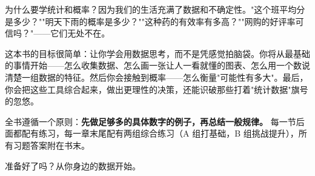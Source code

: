 \documentclass[a4paper,12pt]{ctexart}
\begin{document}
\newpage

\pagestyle{plain}


为什么要学统计和概率？因为我们的生活充满了数据和不确定性。"这个班平均分是多少？""明天下雨的概率是多少？""这种药的有效率有多高？""网购的好评率可信吗？"——它们无处不在。

这本书的目标很简单：让你学会用数据思考，而不是凭感觉拍脑袋。你将从最基础的事情开始——怎么收集数据、怎么画一张让人一看就懂的图表、怎么用一个数说清楚一组数据的特征。然后你会接触到概率——怎么衡量"可能性有多大"。最后，你会把这些工具综合起来，做出更理性的决策，还能识破那些打着"统计数据"旗号的忽悠。

全书遵循一个原则：\textbf{先做足够多的具体数字的例子，再总结一般规律。} 每一节后面都配有练习，每一章末尾配有两组综合练习（A 组打基础，B 组挑战提升），所有习题答案附在书末。

准备好了吗？从你身边的数据开始。

\newpage

\tableofcontents
\newpage








\end{document}
